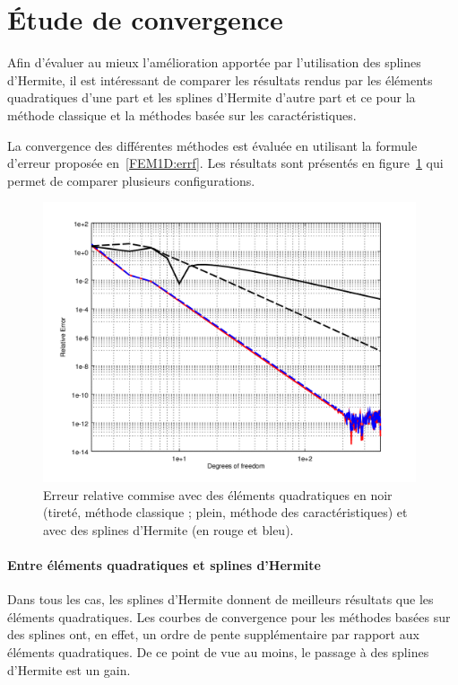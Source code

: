 \section{Étude de convergence}

Afin d'évaluer au mieux l'amélioration apportée par l'utilisation des splines d'Hermite, il est intéressant de comparer
les résultats rendus par les éléments quadratiques d'une part et les splines d'Hermite d'autre part et ce pour la
méthode classique et la méthodes basée sur les caractéristiques.

La convergence des différentes méthodes est évaluée en utilisant la formule d'erreur proposée en~\eqref{FEM1D:errf}.
Les résultats sont présentés en figure~\ref{fig:comp_quad_herm} qui permet de comparer plusieurs configurations.

\begin{figure}[!ht]
	\centering
	\includegraphics[width=11cm]{part4/figs/herm_comp.png}
	\caption{\label{fig:comp_quad_herm}Erreur relative commise avec des éléments quadratiques en noir (tireté,
	méthode classique ; plein, méthode des caractéristiques) et avec des splines d'Hermite (en rouge et bleu).}
\end{figure}

\paragraph{Entre éléments quadratiques et splines d'Hermite}
Dans tous les cas, les splines d'Hermite donnent de meilleurs résultats que les éléments quadratiques. Les courbes de
convergence pour les méthodes basées sur des splines ont, en effet, un ordre de pente supplémentaire par rapport aux
éléments quadratiques. De ce point de vue au moins, le passage à des splines d'Hermite est un gain.

